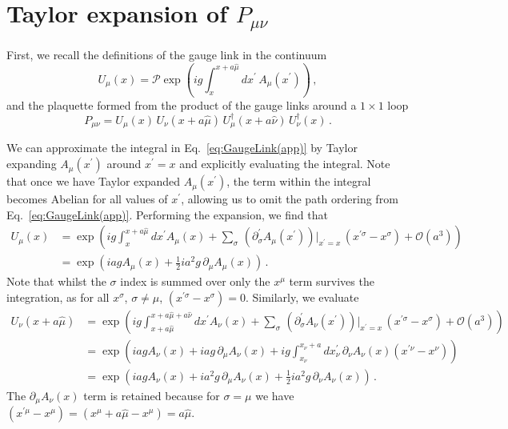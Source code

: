 \chapter{Taylor expansion of $P_{\mu\nu}$}\label{app:TEPlaquette}
First, we recall the definitions of the gauge link in the continuum
%
\begin{equation}
U_\mu(x) = \mathcal{P}\exp\left(ig\int_x^{x+a\hat{\mu}}dx^\prime \, A_\mu(x^\prime)\right)  \, ,
\label{eq:GaugeLink(app)}
\end{equation}
%
and the plaquette formed from the product of the gauge links around a $1\times 1$ loop
\begin{equation}
P_{\mu\nu} = U_\mu(x)\,U_\nu(x+a\hat{\mu})\,U^\dagger_\mu(x+a\hat{\nu})\,U^\dagger_\nu(x)\, .
\label{eq:Plaquette(app)}
\end{equation} 

We can approximate the integral in Eq.~\ref{eq:GaugeLink(app)} by Taylor expanding $A_\mu(x^\prime)$ around $x^\prime=x$ and explicitly evaluating the integral. Note that once we have Taylor expanded $A_\mu(x^\prime)$, the term within the integral becomes Abelian for all values of $x^\prime$, allowing us to omit the path ordering from Eq.~\ref{eq:GaugeLink(app)}. Performing the expansion, we find that
%
\begin{align}
U_\mu(x)&=\exp\left(ig\int_x^{x+a\hat{\mu}} dx^\prime A_\mu\left(x\right) + \sum_\sigma \, \left(\partial^\prime_\sigma A_\mu(x^\prime)\right)\big|_{x^\prime = x}\,(x^{\prime\sigma} - x^\sigma) + \mathcal{O}(a^3)\right)\nonumber\\
&=\exp\left(iag A_\mu\left(x\right) + \frac{1}{2}ia^2 g\, \partial_\mu A_\mu\left(x\right)\right)\, . \label{eq:UTaylor}
\end{align}
%
Note that whilst the $\sigma$ index is summed over only the $x^\mu$ term survives the integration, as for all $x^\sigma$, $\sigma\neq \mu$, $(x^{\prime\sigma}-x^\sigma)=0$. Similarly, we evaluate
%
\begin{align}
U_\nu(x+a\hat{\mu}) &= \exp\left(ig\int_{x+a\hat{\mu}}^{x+a\hat{\mu}+a\hat{\nu}} dx^\prime A_\nu\left(x\right) + \sum_\sigma\,\left(\partial^\prime_\sigma A_\nu(x^\prime)\right)\big|_{x^\prime = x}\,(x^{\prime\sigma} - x^\sigma) + \mathcal{O}(a^3)\right)\nonumber\\
&= \exp\left( iag A_\nu(x) + iag\,\partial_\mu A_\nu (x) + ig\int_{x_\nu}^{x_\nu+a} dx^\prime_\nu \, \partial_\nu A_\nu (x) (x^{\prime\nu} - x^\nu)\right)\nonumber\\
&= \exp\left(iag A_\nu(x) + ia^2g\,\partial_\mu A_\nu(x) + \frac{1}{2}ia^2 g\,\partial_\nu A_\nu(x)\right)\, . \label{eq:UTaylor2}
\end{align}
%
The $\partial_\mu A_\nu (x)$ term is retained because for $\sigma = \mu$ we have $(x^{\prime\mu} - x^\mu) = (x^\mu + a\hat{\mu} - x^\mu) = a\hat{\mu}$.\\

